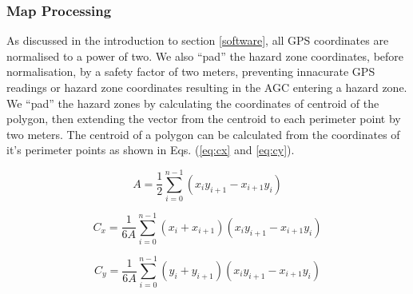 \documentclass[11pt,landscape]{article}
\begin{document}
\begin{multicols}{3}
\subsubsection{Map Processing}
As discussed in the introduction to section \ref{software}, all GPS
coordinates are normalised to a power of two. We also ``pad'' the hazard zone
coordinates, before normalisation, by a safety factor of two meters, preventing innacurate GPS
readings or hazard zone coordinates resulting in the AGC entering a hazard zone.
We ``pad'' the hazard zones by calculating the coordinates of centroid of the
polygon, then extending the vector from the centroid to each perimeter point by
two meters. The centroid of a polygon can be calculated from the coordinates of
it's perimeter points as shown in Eqs. (\ref{eq:cx} and \ref{eq:cy}).
\begin{center}
    \begin{equation*}
        A=\frac{1}{2}\sum_{i=0}^{n-1}\left( x_i y_{i+1} - x_{i+1} y_i\right)
    \end{equation*}
\end{center}
\begin{center}
    \begin{equation}
        C_x=\frac{1}{6A}\sum_{i=0}^{n-1} (x_i + x_{i+1}) (x_i y_{i+1} - x_{i+1} y_i)
        \label{eq:cx}
    \end{equation}
\end{center}
\begin{center}
    \begin{equation}
        C_y=\frac{1}{6A}\sum_{i=0}^{n-1} (y_i + y_{i+1}) (x_i y_{i+1} - x_{i+1} y_i)
        \label{eq:cy}
    \end{equation}
\end{center}

\end{multicols}
\end{document}
